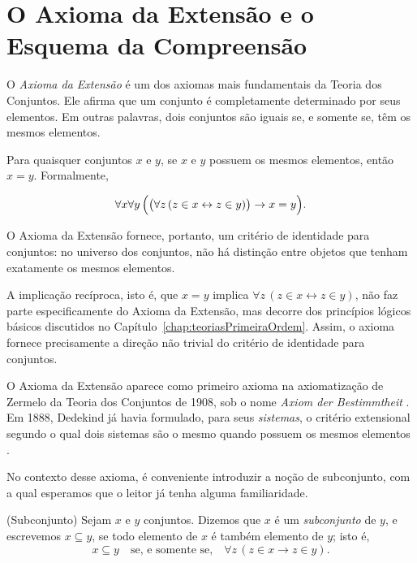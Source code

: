 \section{O Axioma da Extensão e o Esquema da Compreensão}\label{sec:axiomaDaExtensaoECompreensao}
O \emph{Axioma da Extensão} é um dos axiomas mais fundamentais da Teoria dos Conjuntos.
Ele afirma que um conjunto é completamente determinado por seus elementos.
Em outras palavras, dois conjuntos são iguais se, e somente se, têm os mesmos elementos.
\begin{axiom}\label{ax:extensao}
Para quaisquer conjuntos $x$ e $y$, se $x$ e $y$ possuem os mesmos elementos, então $x = y$.
Formalmente,

\[
\forall x \forall y\, \Bigl(\bigl(\forall z\, (z \in x \leftrightarrow z \in y)\bigr) \rightarrow x = y\Bigr).
\]
\end{axiom}

O Axioma da Extensão fornece, portanto, um critério de identidade para conjuntos:
no universo dos conjuntos, não há distinção entre objetos que tenham exatamente os mesmos elementos.

A implicação recíproca, isto é, que $x = y$ implica $\forall z\, (z \in x \leftrightarrow z \in y)$, não faz parte especificamente do Axioma da Extensão, mas decorre dos princípios lógicos básicos discutidos no Capítulo~\ref{chap:teoriasPrimeiraOrdem}.
Assim, o axioma fornece precisamente a direção não trivial do critério de identidade para conjuntos.

O Axioma da Extensão aparece como primeiro axioma na axiomatização de Zermelo da Teoria dos Conjuntos de 1908, sob o nome \emph{Axiom der Bestimmtheit} \cite[p.~263]{zermelo1908untersuchungen}.
Em 1888, Dedekind já havia formulado, para seus \emph{sistemas}, o critério extensional segundo o qual dois sistemas são o mesmo quando possuem os mesmos elementos \cite[\S~2]{dedekind1888was}.


No contexto desse axioma, é conveniente introduzir a noção de subconjunto, com a qual esperamos que o leitor já tenha alguma familiaridade.

\begin{definition}[$\BST$](Subconjunto)\label{def:subconjunto}
Sejam $x$ e $y$ conjuntos.
Dizemos que $x$ é um \emph{subconjunto} de $y$, e escrevemos $x \subseteq y$, se todo elemento de $x$ é também elemento de $y$; isto é,
\[
x \subseteq y \quad \text{se, e somente se,} \quad \forall z\, (z \in x \rightarrow z \in y).
\]
\end{definition}

